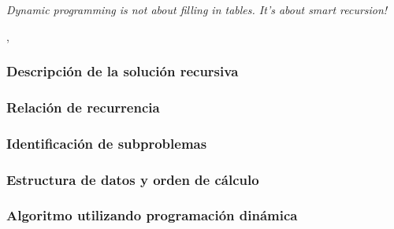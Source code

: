 
\epigraph{\textit{Dynamic programming is not about filling in tables. It's about smart recursion!}}{\citeauthor{algorithms_erickson}, \citeyear{algorithms_erickson} \cite{algorithms_erickson}}


\subsubsection{Descripción de la solución recursiva}

\subsubsection{Relación de recurrencia}

\subsubsection{Identificación de subproblemas}

\subsubsection{Estructura de datos y orden de cálculo}


\subsubsection{Algoritmo utilizando programación dinámica}



